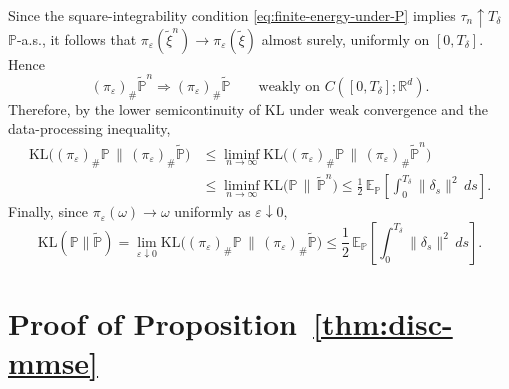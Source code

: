\documentclass[11pt]{article}
\theoremstyle{definition}
\numberwithin{equation}{section}
\begin{document}
Since the square-integrability condition \eqref{eq:finite-energy-under-P}
implies $\tau_n\uparrow T_\delta$ $\mathbb{P}$-a.s., it follows that $\pi_\varepsilon(\tilde\xi^n)\to\pi_\varepsilon(\tilde\xi)$ almost surely,
uniformly on $[0,T_\delta]$. Hence
\[
(\pi_\varepsilon)_\#\tilde{\mathbb P}^n \Rightarrow (\pi_\varepsilon)_\#\tilde{\mathbb P}
\qquad\text{weakly on }C([0,T_\delta];\mathbb R^d).
\]
Therefore, by the lower semicontinuity of $\mathrm{KL}$ under weak convergence and the data-processing inequality,
\begin{align*}
\mathrm{KL}\bigl((\pi_\varepsilon)_\#\mathbb P\,\big\|\,(\pi_\varepsilon)_\#\tilde{\mathbb P}\bigr)
&\le \liminf_{n\to\infty}\mathrm{KL}\bigl((\pi_\varepsilon)_\#\mathbb P\,\big\|\,(\pi_\varepsilon)_\#\tilde{\mathbb P}^n\bigr) \\
&\le \liminf_{n\to\infty}\mathrm{KL}\bigl(\mathbb P\,\big\|\,\tilde{\mathbb P}^n\bigr)
\le \frac12\,\mathbb E_{\mathbb P}\!\left[\int_0^{T_\delta}\|\delta_s\|^2\,ds\right].
\end{align*}
Finally, since $\pi_\varepsilon(\omega)\to\omega$ uniformly as $\varepsilon\downarrow 0$,
\[
\mathrm{KL}(\mathbb P\|\tilde{\mathbb P})
=\lim_{\varepsilon\downarrow 0}\mathrm{KL}\bigl((\pi_\varepsilon)_\#\mathbb P\,\big\|\,(\pi_\varepsilon)_\#\tilde{\mathbb P}\bigr)
\le \frac12\,\mathbb E_{\mathbb P}\!\left[\int_0^{T_\delta}\|\delta_s\|^2\,ds\right].
\]


\section{Proof of Proposition~\ref{thm:disc-mmse}}
\end{document}
